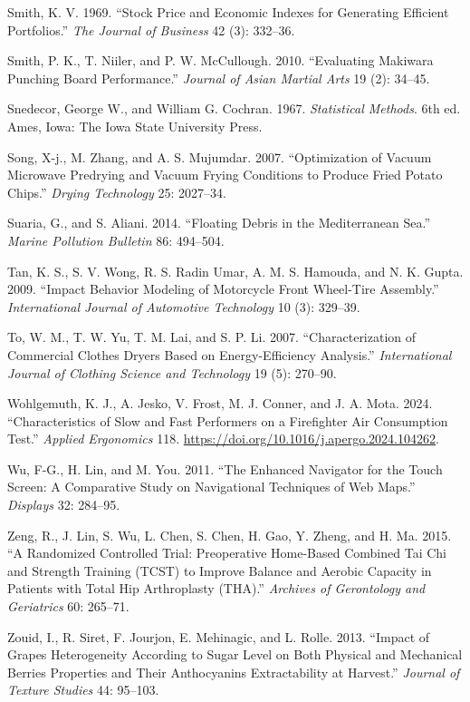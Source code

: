 \documentclass[
]{book}
\newlength{\cslhangindent}
\newenvironment{CSLReferences}[2] %
 {\begin{list}{}{%
  \setlength{\itemindent}{0pt}
  \setlength{\leftmargin}{0pt}
  \setlength{\parsep}{0pt}
  \ifodd #1
   \setlength{\leftmargin}{\cslhangindent}
   \setlength{\itemindent}{-1\cslhangindent}
  \fi
  \setlength{\itemsep}{#2\baselineskip}}}
 {\end{list}}
\begin{document}
\begin{CSLReferences}{1}{0}
Smith, K. V. 1969. {``Stock Price and Economic Indexes for Generating
Efficient Portfolios.''} \emph{The Journal of Business} 42 (3): 332--36.

Smith, P. K., T. Niiler, and P. W. McCullough. 2010. {``Evaluating
Makiwara Punching Board Performance.''} \emph{Journal of Asian Martial
Arts} 19 (2): 34--45.

Snedecor, George W., and William G. Cochran. 1967. \emph{Statistical
Methods}. 6th ed. Ames, Iowa: The Iowa State University Press.

Song, X-j., M. Zhang, and A. S. Mujumdar. 2007. {``Optimization of
Vacuum Microwave Predrying and Vacuum Frying Conditions to Produce Fried
Potato Chips.''} \emph{Drying Technology} 25: 2027--34.

Suaria, G., and S. Aliani. 2014. {``Floating Debris in the Mediterranean
Sea.''} \emph{Marine Pollution Bulletin} 86: 494--504.

Tan, K. S., S. V. Wong, R. S. Radin Umar, A. M. S. Hamouda, and N. K.
Gupta. 2009. {``Impact Behavior Modeling of Motorcycle Front Wheel-Tire
Assembly.''} \emph{International Journal of Automotive Technology} 10
(3): 329--39.

To, W. M., T. W. Yu, T. M. Lai, and S. P. Li. 2007. {``Characterization
of Commercial Clothes Dryers Based on Energy-Efficiency Analysis.''}
\emph{International Journal of Clothing Science and Technology} 19 (5):
270--90.

Wohlgemuth, K. J., A. Jesko, V. Frost, M. J. Conner, and J. A. Mota.
2024. {``Characteristics of Slow and Fast Performers on a Firefighter
Air Consumption Test.''} \emph{Applied Ergonomics} 118.
\url{https://doi.org/10.1016/j.apergo.2024.104262}.

Wu, F-G., H. Lin, and M. You. 2011. {``The Enhanced Navigator for the
Touch Screen: A Comparative Study on Navigational Techniques of Web
Maps.''} \emph{Displays} 32: 284--95.

Zeng, R., J. Lin, S. Wu, L. Chen, S. Chen, H. Gao, Y. Zheng, and H. Ma.
2015. {``A Randomized Controlled Trial: Preoperative Home-Based Combined
Tai Chi and Strength Training (TCST) to Improve Balance and Aerobic
Capacity in Patients with Total Hip Arthroplasty (THA).''}
\emph{Archives of Gerontology and Geriatrics} 60: 265--71.

Zouid, I., R. Siret, F. Jourjon, E. Mehinagic, and L. Rolle. 2013.
{``Impact of Grapes Heterogeneity According to Sugar Level on Both
Physical and Mechanical Berries Properties and Their Anthocyanins
Extractability at Harvest.''} \emph{Journal of Texture Studies} 44:
95--103.

\end{CSLReferences}

\backmatter
\end{document}
